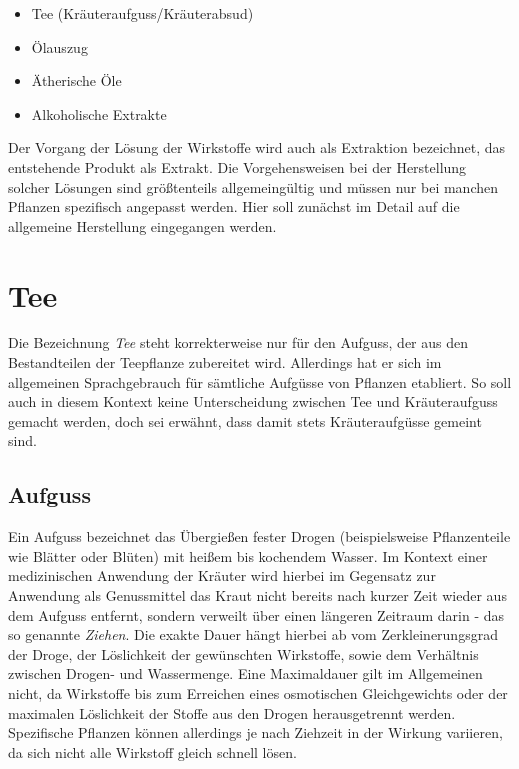 \begin{itemize}
	\item Tee (Kräuteraufguss/Kräuterabsud)
	\item Ölauszug
	\item Ätherische Öle
	\item Alkoholische Extrakte
\end{itemize}

Der Vorgang der Lösung der Wirkstoffe wird auch als Extraktion bezeichnet, das entstehende Produkt als Extrakt. Die Vorgehensweisen bei der Herstellung solcher Lösungen sind größtenteils allgemeingültig und müssen nur bei manchen Pflanzen spezifisch angepasst werden. Hier soll zunächst im Detail auf die allgemeine Herstellung eingegangen werden.



\section{Tee}
\label{   }

Die Bezeichnung \textit{Tee} steht korrekterweise nur für den Aufguss, der aus den Bestandteilen der Teepflanze zubereitet wird. Allerdings hat er sich im allgemeinen Sprachgebrauch für sämtliche Aufgüsse von Pflanzen etabliert. So soll auch in diesem Kontext keine Unterscheidung zwischen Tee und Kräuteraufguss gemacht werden, doch sei erwähnt, dass damit stets Kräuteraufgüsse gemeint sind.



\subsection{Aufguss}
\label{   }

Ein Aufguss bezeichnet das Übergießen fester Drogen (beispielsweise Pflanzenteile wie Blätter oder Blüten) mit heißem bis kochendem Wasser. Im Kontext einer medizinischen Anwendung der Kräuter wird hierbei im Gegensatz zur Anwendung als Genussmittel das Kraut nicht bereits nach kurzer Zeit wieder aus dem Aufguss entfernt, sondern verweilt über einen längeren Zeitraum darin - das so genannte \textit{Ziehen}. Die exakte Dauer hängt hierbei ab vom Zerkleinerungsgrad der Droge, der Löslichkeit der gewünschten Wirkstoffe, sowie dem Verhältnis zwischen Drogen- und Wassermenge. Eine Maximaldauer gilt im Allgemeinen nicht, da Wirkstoffe bis zum Erreichen eines osmotischen Gleichgewichts oder der maximalen Löslichkeit der Stoffe aus den Drogen herausgetrennt werden. Spezifische Pflanzen können allerdings je nach Ziehzeit in der Wirkung variieren, da sich nicht alle Wirkstoff gleich schnell lösen.



